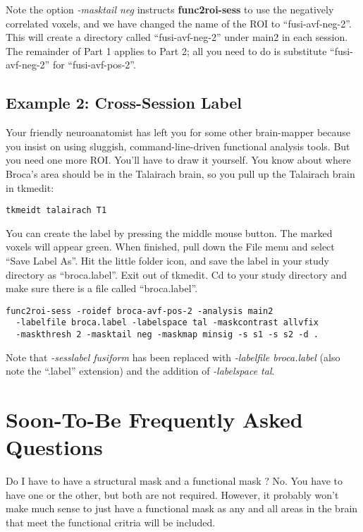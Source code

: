 \documentclass[10pt]{article}
\begin{document}
Note the option {\em -masktail neg} instructs {\bf func2roi-sess} to
use the negatively correlated voxels, and we have changed the name of
the ROI to ``fusi-avf-neg-2''.  This will create a directory called
``fusi-avf-neg-2'' under main2 in each session.  The remainder of Part
1 applies to Part 2; all you need to do is substitute
``fusi-avf-neg-2'' for ``fusi-avf-pos-2''.

\subsection{Example 2: Cross-Session Label}

Your friendly neuroanatomist has left you for some other brain-mapper
because you insist on using sluggish, command-line-driven functional
analysis tools. But you need one more ROI. You'll have to draw it
yourself.  You know about where Broca's area should be in the Talairach
brain, so you pull up the Talairach brain in tkmedit:

\begin{verbatim}
tkmeidt talairach T1
\end{verbatim}

You can create the label by pressing the middle mouse button. The
marked voxels will appear green.  When finished, pull down the File
menu and select ``Save Label As''.  Hit the little folder icon, and
save the label in your study directory as ``broca.label''. Exit out of
tkmedit. Cd to your study directory and make sure there is a file
called ``broca.label''.

\begin{verbatim}
func2roi-sess -roidef broca-avf-pos-2 -analysis main2
  -labelfile broca.label -labelspace tal -maskcontrast allvfix 
  -maskthresh 2 -masktail neg -maskmap minsig -s s1 -s s2 -d . 
\end{verbatim}

Note that {\em -sesslabel fusiform} has been replaced with {\em
-labelfile broca.label} (also note the ``.label'' extension) and the
addition of {\em  -labelspace tal}.

\section{Soon-To-Be Frequently Asked Questions}

Do I have to have a structural mask and a functional mask ?  No. You
have to have one or the other, but both are not required.  However, it
probably won't make much sense to just have a functional mask as any
and all areas in the brain that meet the functional critria will be
included. 
\end{document}
